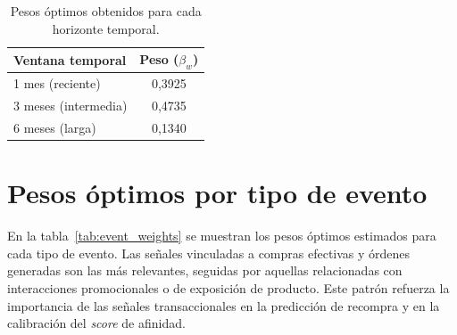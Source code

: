 \begin{table}[H]
\centering
\caption[Pesos óptimos por ventana temporal]{Pesos óptimos obtenidos para cada horizonte temporal.}
\begin{tabular}{l c}
\toprule
\textbf{Ventana temporal} & \textbf{Peso ($\beta_w$)} \\
\midrule
1 mes (reciente) & 0{,}3925 \\
3 meses (intermedia) & 0{,}4735 \\
6 meses (larga) & 0{,}1340 \\
\bottomrule
\end{tabular}
\label{tab:window_weights}
\end{table}

\section{Pesos óptimos por tipo de evento}

En la tabla~\ref{tab:event_weights} se muestran los pesos óptimos estimados para cada tipo de evento.  
Las señales vinculadas a compras efectivas y órdenes generadas son las más relevantes, seguidas por aquellas relacionadas con interacciones promocionales o de exposición de producto.  
Este patrón refuerza la importancia de las señales transaccionales en la predicción de recompra y en la calibración del \textit{score} de afinidad.

